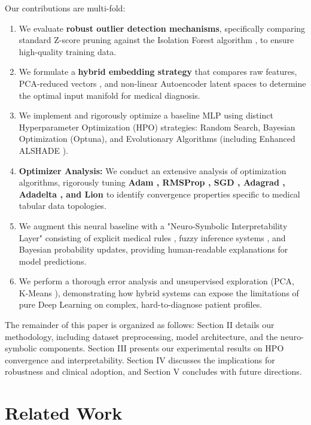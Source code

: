 \documentclass[conference]{IEEEtran}
\begin{document}
Our contributions are multi-fold:
\begin{enumerate}
    \item We evaluate \textbf{robust outlier detection mechanisms}, specifically comparing standard Z-score pruning against the Isolation Forest algorithm \cite{cheng2019iforest}, to ensure high-quality training data.
    \item We formulate a \textbf{hybrid embedding strategy} that compares raw features, PCA-reduced vectors \cite{kherif2020pca}, and non-linear Autoencoder latent spaces \cite{tschannen2018ae} to determine the optimal input manifold for medical diagnosis.
    \item We implement and rigorously optimize a baseline MLP using distinct Hyperparameter Optimization (HPO) strategies: Random Search, Bayesian Optimization (Optuna), and Evolutionary Algorithms (including Enhanced ALSHADE \cite{karpinski2025deullm}).
    \item \textbf{Optimizer Analysis:} We conduct an extensive analysis of optimization algorithms, rigorously tuning \textbf{Adam \cite{zhang2026adam}, RMSProp \cite{elshamy2023rmsprop}, SGD \cite{xing2018sgd}, Adagrad \cite{venkatesh2020adagrad}, Adadelta \cite{veeramsetty2025adadelta}, and Lion \cite{chen2023lion}} to identify convergence properties specific to medical tabular data topologies.
    \item We augment this neural baseline with a "Neuro-Symbolic Interpretability Layer" consisting of explicit medical rules \cite{turgunbaev2025rule}, fuzzy inference systems \cite{arji2019fuzzy}, and Bayesian probability updates, providing human-readable explanations for model predictions.
    \item We perform a thorough error analysis and unsupervised exploration (PCA, K-Means \cite{ahmed2020kmeans}), demonstrating how hybrid systems can expose the limitations of pure Deep Learning on complex, hard-to-diagnose patient profiles.
\end{enumerate}

The remainder of this paper is organized as follows: Section II details our methodology, including dataset preprocessing, model architecture, and the neuro-symbolic components. Section III presents our experimental results on HPO convergence and interpretability. Section IV discusses the implications for robustness and clinical adoption, and Section V concludes with future directions.

\section{Related Work}
\end{document}
